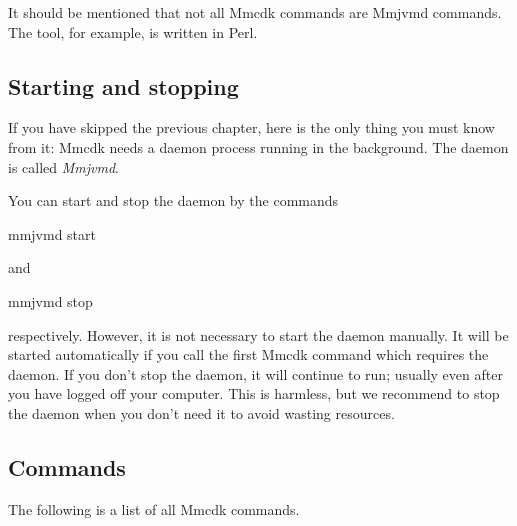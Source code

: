 \documentclass{generic}
\begin{document}
It should be mentioned that not all Mmcdk commands are Mmjvmd commands. The
 tool, for example, is written in Perl.


\subsection{Starting and stopping}

If you have skipped the previous chapter, here is the only thing you must know
from it: Mmcdk needs a daemon process running in the background. The daemon is
called \emph{Mmjvmd}.

You can start and stop the daemon by the commands

\begin{preformatted}mmjvmd start\end{preformatted}

and

\begin{preformatted}mmjvmd stop\end{preformatted}

respectively. However, it is not necessary to start the daemon manually. It
will be started automatically if you call the first Mmcdk command which
requires the daemon. If you don't stop the daemon, it will continue to run;
usually even after you have logged off your computer. This is harmless, but we
recommend to stop the daemon when you don't need it to avoid wasting resources.

\subsection{Commands}

The following is a list of all Mmcdk commands.
\end{document}
